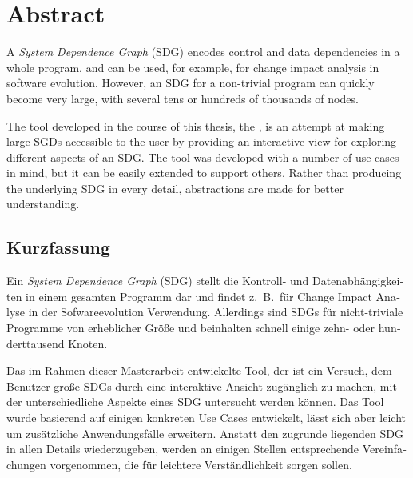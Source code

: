 \chapter*{Abstract} \vspace{-0.5cm}

A \emph{System Dependence Graph} (SDG) encodes control and data dependencies in a whole program, and can be used, for 
example, for change impact analysis in software evolution. However, an SDG for a non-trivial program can quickly become 
very large, with several tens or hundreds of thousands of nodes.

The tool developed in the course of this thesis, the \emph{\SB}, is an attempt at making large SGDs accessible to the 
user by providing an interactive view for exploring different aspects of an SDG. The tool was developed with a number 
of use cases in mind, but it can be easily extended to support others. Rather than producing the underlying SDG in 
every detail, abstractions are made for better understanding.


\begin{otherlanguage}{ngerman}
\begingroup
\let\clearpage\relax
\chapter*{Kurzfassung} \vspace{-0.5cm}
\endgroup

Ein \emph{System Dependence Graph} (SDG) stellt die Kontroll- und Datenabhängigkeiten in einem gesamten Programm dar 
und findet z.\ B.\ für Change Impact Analyse in der Sofwareevolution Verwendung. Allerdings sind SDGs für 
nicht-triviale Programme von erheblicher Größe und beinhalten schnell einige zehn- oder hunderttausend Knoten.

Das im Rahmen dieser Masterarbeit entwickelte Tool, der \emph{\SB} ist ein Versuch, dem Benutzer große SDGs durch eine 
interaktive Ansicht zugänglich zu machen, mit der unterschiedliche Aspekte eines SDG untersucht werden können. Das Tool 
wurde basierend auf einigen konkreten Use Cases entwickelt, lässt sich aber leicht um zusätzliche Anwendungsfälle 
erweitern. Anstatt den zugrunde liegenden SDG in allen Details wiederzugeben, werden an einigen Stellen entsprechende 
Vereinfachungen vorgenommen, die für leichtere Verständlichkeit sorgen sollen.

\end{otherlanguage}
